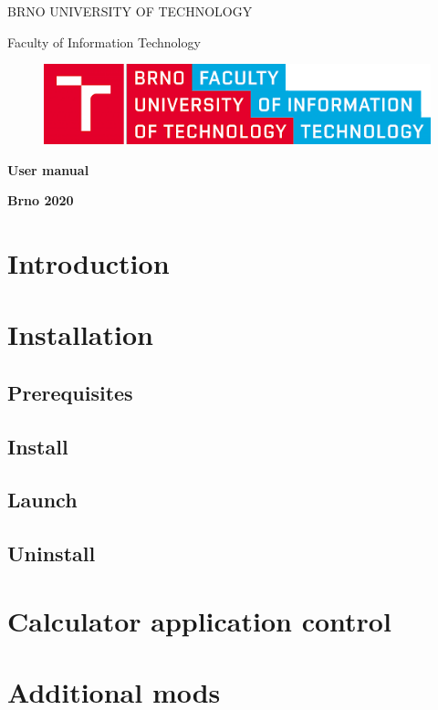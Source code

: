 \documentclass[12pt]{article}
\begin{document}
\pagestyle{empty}











\centerline{\LARGE\uppercase{Brno University of Technology}}
\vspace{1\baselineskip}
\centerline{\LARGE{Faculty of Information Technology}}
\vspace{1\baselineskip}
\begin{figure}[H]
\centering
  \includegraphics[scale=0.4]{logo.png}
  \label{fig:logo}
\end{figure}
\vspace{15\baselineskip}
\centerline{\LARGE\textbf{User manual}}

\vspace{14\baselineskip}
\centerline{\large\textbf{Brno 2020}}

\newpage
\pagestyle{plain}     
\setcounter{page}{1} 
\tableofcontents

\newpage
\setcounter{page}{1}
\section{Introduction}
\newpage
\section{Installation}
\subsection{Prerequisites}
\subsection{Install}
\subsection{Launch}
\subsection{Uninstall}
\newpage
\section{Calculator application control}
\newpage
\section{Additional mods}
\end{document}
